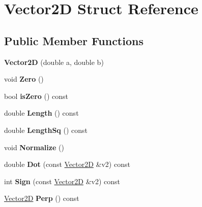 \hypertarget{structVector2D}{}\section{Vector2D Struct Reference}
\label{structVector2D}
\subsection*{Public Member Functions}
\begin{DoxyCompactItemize}
\item 
\mbox{\label{structVector2D_a5a6dfe0c8c79626b485c7a17e964c692}} 
{\bfseries Vector2D} (double a, double b)
\item 
\mbox{\label{structVector2D_a0f80d7fc49a21f3f0e414300ec033ce6}} 
void {\bfseries Zero} ()
\item 
\mbox{\label{structVector2D_af368803cca03d8daa572f3f23e68453a}} 
bool {\bfseries is\+Zero} () const
\item 
\mbox{\label{structVector2D_adf941f3e417b6dfe737bc800800149af}} 
double {\bfseries Length} () const
\item 
\mbox{\label{structVector2D_a1c8aefc20c23520837a1d0268b028884}} 
double {\bfseries Length\+Sq} () const
\item 
\mbox{\label{structVector2D_ac68f4dafca1639747c67c1b01e3a9f28}} 
void {\bfseries Normalize} ()
\item 
\mbox{\label{structVector2D_ad2f2dc12faf5165413b379e48bd83e06}} 
double {\bfseries Dot} (const \mbox{\hyperlink{structVector2D}{Vector2D}} \&v2) const
\item 
\mbox{\label{structVector2D_a89b83b3346369eb59d1cce0966621f2d}} 
int {\bfseries Sign} (const \mbox{\hyperlink{structVector2D}{Vector2D}} \&v2) const
\item 
\mbox{\label{structVector2D_a5a96e4095069b9a0ccad27d918031e5b}} 
\mbox{\hyperlink{structVector2D}{Vector2D}} {\bfseries Perp} () const
\item 

\end{DoxyCompactItemize}
